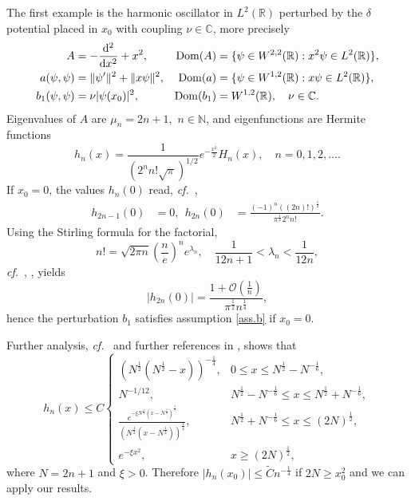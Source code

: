 The first example is the harmonic oscillator in $L^2({{\mathbb{R}}})$ perturbed by the $\delta$ potential placed in $x_0$ with coupling $\nu \in {{\mathbb{C}}}$, more precisely
\begin{equation}
\label{ho.def}
\begin{aligned}
A &= -\frac{{{{\rm d}}}^2}{{{{\rm d}}} x^2} + x^2,
&{{\operatorname{Dom}}}(A) & = \{ \psi \in W^{2,2}({{\mathbb{R}}}): x^2 \psi \in L^2({{\mathbb{R}}})\}, \\
a(\psi,\psi) & = \|\psi'\|^2 + \|x \psi\|^2, 
&{{\operatorname{Dom}}}(a) & = \{\psi \in W^{1,2}({{\mathbb{R}}}): x \psi \in L^2({{\mathbb{R}}}) \}, \\
b_1(\psi,\psi) & = \nu |\psi(x_0)|^2, 
&{{\operatorname{Dom}}}(b_1) & = W^{1,2}({{\mathbb{R}}}), \quad \nu \in {{\mathbb{C}}}.
\end{aligned}
\end{equation}
Eigenvalues of $A$ are $\mu_n=2n+1,$ $n \in {\mathbb{N}}$, and eigenfunctions are Hermite functions
\begin{equation}
\label{hn.expl}
h_n(x) = \frac{1}{(2^n n! \sqrt{\pi})^{1/2}}e^{-\frac{x^2}{2} }H_n(x), \quad n=0,1,2,\dots.
\end{equation}
If $x_0 =0$, the values $h_n(0)$ read, {\emph{cf.}}~\cite[Eq.22.4.8, Eq.22.2.14]{Abramowitz-1964-55},
\begin{equation*}
\begin{aligned}
h_{2n-1}(0) &= 0, \ \ 
h_{2n}(0) & = \frac{(-1)^n ((2n)!)^{\frac{1}{2}}}{ \pi^{\frac{1}{4}} 2^n n! }.
\end{aligned}
\end{equation*}
Using the Stirling formula for the factorial,
$$n! = \sqrt{2\pi n} 
\left(
\frac{n}{e}
\right)^n e^{\lambda_n}, \quad \frac{1}{12n+1} < \lambda_n < \frac{1}{12n}, $$
{\emph{cf.}}~\cite[Eq.6.1.38]{Abramowitz-1964-55}, \cite[\S 2.9]{Feller-1968}, yields
\begin{equation}\label{hn.bound}
|h_{2n}(0)| =  \frac{1+\mathcal{O}(\frac{1}{n})}{\pi^{\frac{1}{2}} n^{\frac{1}{4}}},
\end{equation}
hence the perturbation $b_1$ satisfies assumption \eqref{ass.b} if $x_0=0$. 

Further analysis, {\emph{cf.}}~\cite[p.700]{Askey-1965-87} and further references in 
\cite{Adduci-2012-10}, shows that
\begin{equation}\label{hn.est}
h_n(x) \leq C
\begin{cases}
(N^{\frac{1}{2}} (N^{\frac{1}{2}} - x ))^{-\frac{1}{4}}, 
& 0 \leq x \leq N^{\frac{1}{2}} - N^{-\frac{1}{6}},  
\\
N^{-1/12}, 
& N^{\frac{1}{2}} - N^{-\frac{1}{6}} \leq x \leq N^{\frac{1}{2}} + N^{-\frac{1}{6}},
\\ 
\frac{e^{- \xi N^{\frac{1}{4} } (x-N^{\frac{1}{2}})^{\frac{3}{2}}}}
{(N^{\frac{1}{2}} (x -N^{\frac{1}{2}}))^{\frac{1}{4}}}
,
& N^{\frac{1}{2}} + N^{-\frac{1}{6}} \leq x \leq (2N)^{\frac{1}{2}},
\\
e^{- \xi x^2}, & x \geq (2N)^{\frac{1}{2}},
\end{cases}
\end{equation}
where $N=2n+1$ and $\xi >0$. Therefore $|h_n(x_0)| \leq \tilde C n^{-\frac{1}{4}}$ if $2 N \geq x_0^2$  and we can apply our results.

